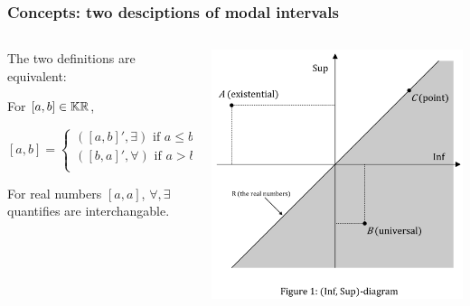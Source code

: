\documentclass{beamer}
\begin{document}
\begin{frame}
    \frametitle{Concepts: two desciptions of modal intervals}

    \begin{columns}[T]
        \begin{column}{.5\textwidth}
            The two definitions are equivalent:

            \vspace{7mm}
            For $[a, b] \in \mathbb{KR}$,
            \par $[a, b] = \begin{cases}
                ([a, b]', \exists) \text{ if } a \leq b \; \text{(proper)} \\
                ([b, a]', \forall) \text{ if } a > b \; \text{(improper)} \\
                            \end{cases}$

            \vspace{7mm}
            For real numbers $[a, a]$, $\forall, \exists$ quantifies are interchangable.

        \end{column}
        \begin{column}{.5\textwidth}
            \includegraphics[scale=0.3]{inf-sup-diagram.png}

        \end{column}
    \end{columns}

\end{frame}
\end{document}
